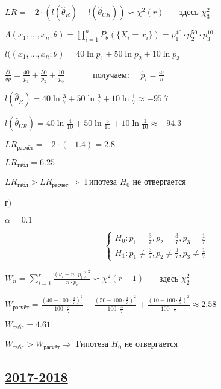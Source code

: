 \begin{enumerate}
	$LR = -2 \cdot (l(\hat \theta_R)-l(\hat \theta_{UR})) \backsim \chi^2 (r)$ \ \ \ здесь $\chi_3^2$
	\par\bigskip
	$\Lambda(x_1, ...,x_n;\theta) = \prod\nolimits_{i=1}^n P_\theta (\{X_i = x_i\})= p_1^{40} \cdot p_2^{50} \cdot p_3^{10}$
	\par\bigskip
	$l((x_1, ...,x_n;\theta)= 40\ln {p_1} + 50\ln {p_2} + 10\ln {p_3} $
	\par\bigskip
	$\frac{\delta l}{\delta p} = \frac{40}{p_1} + \frac{50}{p_2} + \frac{10}{p_3}$ \ \ \ \ \ \ получаем: \ \ $\hat p_i = \frac{a_i}{n}$
	\par\bigskip
	$l(\hat \theta_R) = 40\ln {\frac{3}{7}} + 50\ln {\frac{3}{7}} + 10\ln {\frac{1}{7}} \approx -95.7$
	\par\bigskip
	$l(\hat \theta_{UR}) = 40\ln {\frac{4}{10}} + 50\ln {\frac{5}{10}} + 10\ln {\frac{1}{10}} \approx -94.3$
	\par\bigskip
	$LR_{\mbox{расчёт}} = -2 \cdot (-1.4) = 2.8$
	\par\bigskip
	$LR_{\mbox{табл}} = 6.25$
	\par\bigskip
	$LR_{\mbox{табл}} > LR_{\mbox{расчёт}} \Rightarrow$ Гипотеза $H_0$ не отвергается
	\par\bigskip
	г$)$
	
	$\alpha = 0.1$
	
	\[
	\left\{
	\begin{array}{ll}
	H_0: p_1 = \frac{3}{7}, p_2 = \frac{3}{7}, p_3 = \frac{1}{7} \\
	H_1: p_1 \neq \frac{3}{7}, p_2 \neq \frac{3}{7}, p_3 \neq \frac{1}{7} 
	\end{array}
	\right.
	\]
	
	$W_n = \sum_{i=1}^r\frac{(\nu_i - n \cdot p_i)^2}{n \cdot p_i}\backsim \chi^2 (r-1)$ \ \ \ здесь $\chi_2^2$
	\par\bigskip
	$W_{\mbox{расчёт}} = \frac{(40 - 100 \cdot \frac{3}{7})^2}{100 \cdot \frac{3}{7}} + \frac{(50 - 100 \cdot \frac{3}{7})^2}{100 \cdot \frac{3}{7}} + \frac{(10 - 100 \cdot \frac{1}{7})^2}{100 \cdot \frac{1}{7}} \approx 2.58 $
	\par\bigskip
	$W_{\mbox{табл}} = 4.61$
	\par\bigskip
	$W_{\mbox{табл}} > W_{\mbox{расчёт}} \Rightarrow$ Гипотеза $H_0$ не отвергается
	
\end{enumerate} 


\subsection[2017-2018]{\hyperref[sec:kr_04_2017_2018]{2017-2018}}
\label{sec:sol_kr_04_2017_2018}

